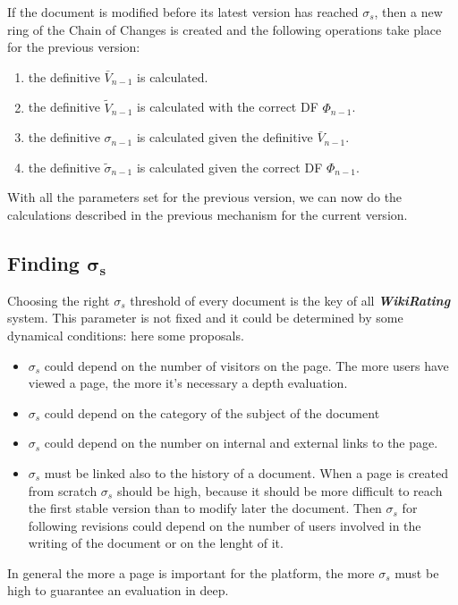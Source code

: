 \documentclass[a4paper,11pt]{article}
\newcommand{\wir}{\textbf{\textit{WikiRating }}}
\begin{document}
If the document is modified before its latest version has reached $\sigma_s$, then a new ring of the Chain of Changes is created and the following operations take place for the previous version:
\begin{enumerate}
\item the definitive $\bar{V}_{n-1}$ is calculated.
\item the definitive $\tilde{V}_{n-1}$ is calculated with the correct DF $\Phi_{n-1}$.
\item the definitive $\sigma_{n-1}$ is calculated given the definitive $\bar{V}_{n-1}$.
\item the definitive $\tilde{\sigma}_{n-1}$ is calculated given the correct DF $\Phi_{n-1}$.
\end{enumerate}
With all the parameters set for the previous version, we can now do the calculations described in the previous mechanism for the current version.

\subsection{Finding $\boldsymbol{\sigma_s}$} \label{sec:choose_sigma}
Choosing the right $\sigma_s$ threshold of every document is the key of all \wir system.
This parameter is not fixed and it could be determined by some dynamical conditions: here some proposals.
\begin{itemize}
\item $\sigma_s$ could depend on the number of visitors on the page. The more users have viewed a page, the more it's necessary a depth evaluation.
\item $\sigma_s$ could depend on the category of the subject of the document
\item $\sigma_s$ could depend on the number on internal and external links to the page. 
\item $\sigma_s$ must be linked also to the history of a document. When a page is created from scratch $\sigma_s$ should be high, because it should be more difficult to reach the first stable version than to modify later the document. Then $\sigma_s$ for following revisions could depend on the number of users involved in the writing of the document or on the lenght of it.
\end{itemize}

In general the more a page is important for the platform, the more $\sigma_s$ must be high to guarantee an evaluation in deep.


\newpage
\end{document}
